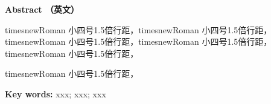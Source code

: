 \begin{center}
    {  \textbf{\tnewroman Abstract （\hwfs 英文）} }
\end{center}

\begin{spacing}{1.5}
    {  \tnewroman
   timesnewRoman 小四号1.5倍行距，timesnewRoman 小四号1.5倍行距，timesnewRoman 小四号1.5倍行距，timesnewRoman 小四号1.5倍行距，timesnewRoman 小四号1.5倍行距，

   timesnewRoman 小四号1.5倍行距，
    
    \noindent \textbf{Key words: } xxx; xxx; xxx
    }
\end{spacing}
\newpage
